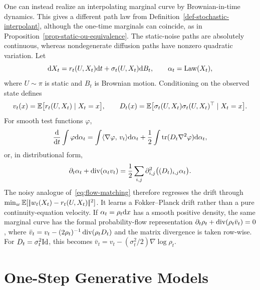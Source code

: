 \begin{rem}\label{rem-noisy-stochastic-interpolants}
One can instead realize an interpolating marginal curve by Brownian-in-time dynamics. This gives a different path law from Definition~\ref{def-stochastic-interpolant}, although the one-time marginals can coincide, as in Proposition~\ref{prop-static-ou-equivalence}. The static-noise paths are absolutely continuous, whereas nondegenerate diffusion paths have nonzero quadratic variation. Let
\[
	\mathrm{d} X_t=r_t(U,X_t)\mathrm{d} t+\sigma_t(U,X_t)\mathrm{d} B_t,
	\qquad \alpha_t=\operatorname{Law}(X_t),
\]
where $U\sim\pi$ is static and $B_t$ is Brownian motion. Conditioning on the observed state defines
\[
	v_t(x)=\mathbb{E}\bigl[r_t(U,X_t)\mid X_t=x\bigr],
	\qquad
	D_t(x)=\mathbb{E}\bigl[\sigma_t(U,X_t)\sigma_t(U,X_t)^\top\mid X_t=x\bigr].
\]
For smooth test functions $\varphi$,
\[
	\frac{\mathrm{d}}{\mathrm{d} t}\int\varphi\mathrm{d}\alpha_t
	=
	\int\langle \nabla\varphi,\,v_t\rangle\mathrm{d}\alpha_t
	+
	\frac12\int\operatorname{tr}(D_t\nabla^2\varphi)\mathrm{d}\alpha_t,
\]
or, in distributional form,
\begin{equation}\label{eq:noisy-interpolant-fokker-planck}
	\partial_t\alpha_t+\operatorname{div}(\alpha_tv_t)
	=
	\frac12\sum_{i,j}\partial_{i,j}^2\bigl((D_t)_{i,j}\alpha_t\bigr).
\end{equation}
The noisy analogue of~\eqref{eq:flow-matching} therefore regresses the drift through $\min_w\mathbb{E}[|\!| w_t(X_t)-r_t(U,X_t) |\!|^2]$. It learns a Fokker--Planck drift rather than a pure continuity-equation velocity. If $\alpha_t=\rho_t\mathrm{d} x$ has a smooth positive density, the same marginal curve has the formal probability-flow representation $\partial_t\rho_t+\operatorname{div}(\rho_t\bar v_t)=0$, where $\bar v_t=v_t-(2\rho_t)^{-1}\operatorname{div}(\rho_tD_t)$ and the matrix divergence is taken row-wise. For $D_t=\sigma_t^2\mathrm{Id}$, this becomes $\bar v_t=v_t-(\sigma_t^2/2)\nabla\log\rho_t$.
\end{rem}


\section{One-Step Generative Models}
\label{sec-one-step-generative-models}

